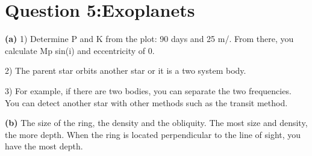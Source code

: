\section{ Question 5:Exoplanets }\label{sec:q5}    


\textbf{(a)} 1) Determine P and K from the plot: 90 days and 25 m/. From there, you calculate Mp sin(i) and eccentricity of 0.


2) The parent star orbits another star or it is a two system body.


3) For example, if there are two bodies, you can separate the two frequencies. You can detect another star with other methods such as the transit method.


\textbf{(b)} The size of the ring, the density and the obliquity. The most size and density, the more depth. When the ring is located perpendicular to the line of sight, you have the most depth.  